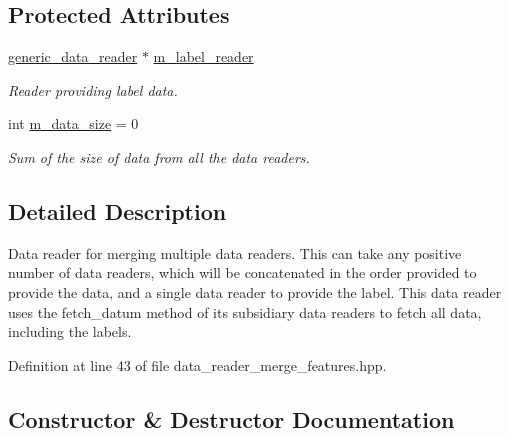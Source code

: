 \subsection*{Protected Attributes}
\begin{DoxyCompactItemize}
\item 
\hyperlink{classlbann_1_1generic__data__reader}{generic\+\_\+data\+\_\+reader} $\ast$ \hyperlink{classlbann_1_1data__reader__merge__features_a1e54a136c63b934f44ff91dc68ea3b27}{m\+\_\+label\+\_\+reader}
\begin{DoxyCompactList}\small\item\em Reader providing label data. \end{DoxyCompactList}\item 
int \hyperlink{classlbann_1_1data__reader__merge__features_ac9c56e08a45a5beac97e41e403fbaa12}{m\+\_\+data\+\_\+size} = 0
\begin{DoxyCompactList}\small\item\em Sum of the size of data from all the data readers. \end{DoxyCompactList}\end{DoxyCompactItemize}


\subsection{Detailed Description}
Data reader for merging multiple data readers. This can take any positive number of data readers, which will be concatenated in the order provided to provide the data, and a single data reader to provide the label. This data reader uses the fetch\+\_\+datum method of its subsidiary data readers to fetch all data, including the labels. 

Definition at line 43 of file data\+\_\+reader\+\_\+merge\+\_\+features.\+hpp.



\subsection{Constructor \& Destructor Documentation}
\mbox{\label{classlbann_1_1data__reader__merge__features_ac05d7a06c3a5749afc41c3b86bb2475d}} 
